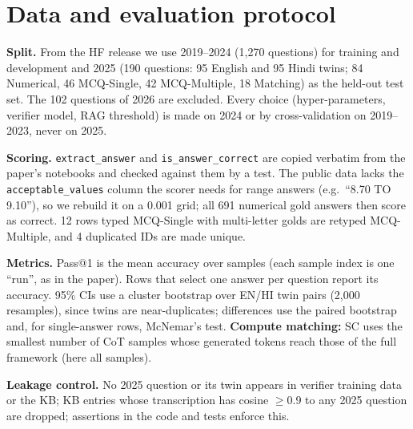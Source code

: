 \documentclass[conference]{IEEEtran}
\begin{document}
\section{Data and evaluation protocol}
\textbf{Split.} From the HF release we use 2019--2024 (1{,}270 questions) for training and
development and 2025 (190 questions: 95 English and 95 Hindi twins; 84 Numerical, 46 MCQ-Single,
42 MCQ-Multiple, 18 Matching) as the held-out test set. The 102 questions of 2026 are excluded.
Every choice (hyper-parameters, verifier model, RAG threshold) is made on 2024 or by
cross-validation on 2019--2023, never on 2025.

\textbf{Scoring.} \texttt{extract\_answer} and \texttt{is\_answer\_correct} are copied verbatim
from the paper's notebooks and checked against them by a test. The public data lacks the
\texttt{acceptable\_values} column the scorer needs for range answers (e.g.\ ``8.70 TO 9.10''),
so we rebuild it on a 0.001 grid; all 691 numerical gold answers then score as correct. 12 rows
typed MCQ-Single with multi-letter golds are retyped MCQ-Multiple, and 4 duplicated IDs are made
unique.

\textbf{Metrics.} Pass@1 is the mean accuracy over samples (each sample index is one ``run'', as
in the paper). Rows that select one answer per question report its accuracy. 95\% CIs use a
cluster bootstrap over EN/HI twin pairs (2{,}000 resamples), since twins are near-duplicates;
differences use the paired bootstrap and, for single-answer rows, McNemar's test.
\textbf{Compute matching:} SC uses the smallest number of CoT samples whose generated tokens
reach those of the full framework (here all \ScN{} samples).

\textbf{Leakage control.} No 2025 question or its twin appears in verifier training data or the
KB; KB entries whose transcription has cosine $\ge$0.9 to any 2025 question are dropped;
assertions in the code and tests enforce this.

\end{document}

